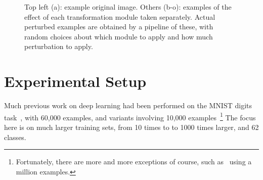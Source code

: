 \documentclass{article} %
\begin{document}
\begin{figure}[ht]
\caption{Top left (a): example original image. Others (b-o): examples of the effect
of each transformation module taken separately. Actual perturbed examples are obtained by
a pipeline of these, with random choices about which module to apply and how much perturbation
to apply.}
\label{fig:transform}
\end{figure}

\section{Experimental Setup}

Much previous work on deep learning had been performed on
the MNIST digits task~\citep{Hinton06,ranzato-07-small,Bengio-nips-2006,Salakhutdinov+Hinton-2009},
with 60,000 examples, and variants involving 10,000
examples~\citep{Larochelle-jmlr-2009,VincentPLarochelleH2008-very-small}\footnote{Fortunately, there
are more and more exceptions of course, such as~\citet{RainaICML09-small} using a million examples.}
The focus here is on much larger training sets, from 10 times to 
to 1000 times larger, and 62 classes.
\end{document}
